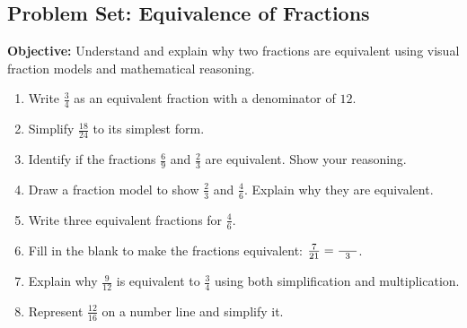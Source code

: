 \documentclass[12pt]{article}
\title{}
\date{}
\begin{document}
\subsection*{Problem Set: Equivalence of Fractions}
\onehalfspacing

\begin{tcolorbox}[colframe=black!40, colback=gray!5, 
coltitle=black, colbacktitle=black!20, fonttitle=\bfseries\Large, 
title=Learning Objective, halign title=center, left=5pt, right=5pt, top=5pt, bottom=15pt]
\textbf{Objective:} Understand and explain why two fractions are equivalent using visual fraction models and mathematical reasoning.
\end{tcolorbox}

\begin{tcolorbox}[colframe=black!60, colback=white, 
coltitle=black, colbacktitle=black!15, fonttitle=\bfseries\Large, 
title=Exercises, halign title=center, left=10pt, right=10pt, top=10pt, bottom=60pt]
\begin{enumerate}[itemsep=3em]
    \item Write \( \frac{3}{4} \) as an equivalent fraction with a denominator of \( 12 \).
    \item Simplify \( \frac{18}{24} \) to its simplest form.
    \item Identify if the fractions \( \frac{6}{9} \) and \( \frac{2}{3} \) are equivalent. Show your reasoning.
    \item Draw a fraction model to show \( \frac{2}{3} \) and \( \frac{4}{6} \). Explain why they are equivalent.
    \item Write three equivalent fractions for \( \frac{4}{6} \).
    \item Fill in the blank to make the fractions equivalent: \( \frac{7}{21} = \frac{\hspace{5mm}}{3} \).
    \item Explain why \( \frac{9}{12} \) is equivalent to \( \frac{3}{4} \) using both simplification and multiplication.
    \item Represent \( \frac{12}{16} \) on a number line and simplify it.
\end{enumerate}
\end{tcolorbox}

\vspace{1em}
\end{document}
